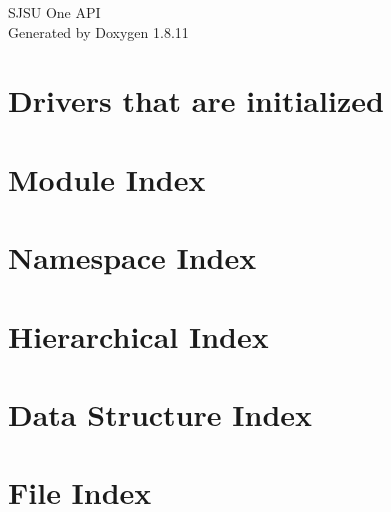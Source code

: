 \documentclass[twoside]{book}
\newcommand{\+}{\discretionary{\mbox{\scriptsize$\hookleftarrow$}}{}{}}
\newcommand{\clearemptydoublepage}{%
  \newpage{\pagestyle{empty}\cleardoublepage}%
}
\begin{document}
\hypersetup{pageanchor=false,
             bookmarksnumbered=true,
             pdfencoding=unicode
            }
\begin{titlepage}
\vspace*{7cm}
\begin{center}%
{\Large S\+J\+SU One A\+PI }\\
\vspace*{1cm}
{\large Generated by Doxygen 1.8.11}\\
\end{center}
\end{titlepage}
\clearemptydoublepage
\tableofcontents
\clearemptydoublepage
{}
\hypersetup{pageanchor=true}

\chapter{Drivers that are initialized}
\label{index}\hypertarget{index}{}
\chapter{Module Index}

\chapter{Namespace Index}

\chapter{Hierarchical Index}

\chapter{Data Structure Index}

\chapter{File Index}

\end{document}
